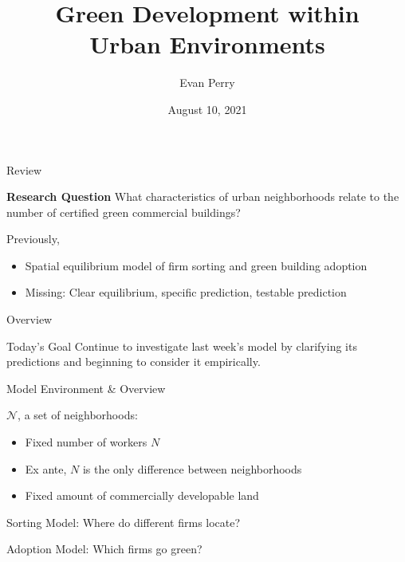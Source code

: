 \documentclass[11pt, dvipsnames, usenames]{beamer}
\title{Green Development within\\ Urban Environments}
\institute{Spellman Program}
\author{Evan Perry}
\date{August 10, 2021}
\begin{document}
\maketitlepage

\begin{frame}{Review}

\begin{exampleblock}{\large\textbf{Research Question}}
What characteristics of urban neighborhoods relate to the number of certified green commercial buildings?
\end{exampleblock}

\vfill
Previously,
\begin{itemize}
	\item Spatial equilibrium model of firm sorting and green building adoption
	\item Missing: Clear equilibrium, specific prediction, testable prediction
\end{itemize}

\end{frame}

\begin{frame}{Overview}

\begin{block}{Today's Goal}
Continue to investigate last week's model by clarifying its predictions and beginning to consider it empirically.
\end{block}

\tableofcontents

\end{frame}


\begin{frame}{Model Environment \& Overview}

$\mathcal{N}$, a set of neighborhoods:
\begin{itemize}
	\item Fixed number of workers $N$
	\item Ex ante, $N$ is the only difference between neighborhoods
	\item Fixed amount of commercially developable land
\end{itemize}

\vfill
Sorting Model: Where do different firms locate?

\vfill
Adoption Model: Which firms go green?

\end{frame}
\end{document}
